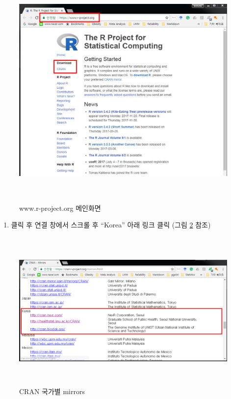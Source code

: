 \documentclass[12pt,a4paper]{book}
\providecommand{\tightlist}{%
  \setlength{\itemsep}{0pt}\setlength{\parskip}{0pt}}
\theoremstyle{definition}
\theoremstyle{definition}
\theoremstyle{definition}
\theoremstyle{remark}
\begin{document}
\begin{figure}[H]
{
  \centering
  \includegraphics[width = 12cm, height = 12cm]{Figures/Rorg-main-add.png}
  \caption[www.r-project.org 메인화면]{www.r-project.org 메인화면}\label{fig:R-install-01}
}
\end{figure}

\begin{enumerate}
\def\labelenumi{\arabic{enumi}.}
\setcounter{enumi}{2}
\tightlist
\item
  클릭 후 연결 창에서 스크롤 후 ``Korea'' 아래 링크 클릭 (그림
  \ref{fig:R-install-02} 참조)
\end{enumerate}

\begin{figure}[H]
{
  \centering
  \includegraphics[width = 12cm, height = 8cm]{Figures/CRAN-korea-01.PNG}
  \caption[CRAN 국가별 mirrors]{CRAN 국가별 mirrors}\label{fig:R-install-02}
}
\end{figure}
\end{document}
